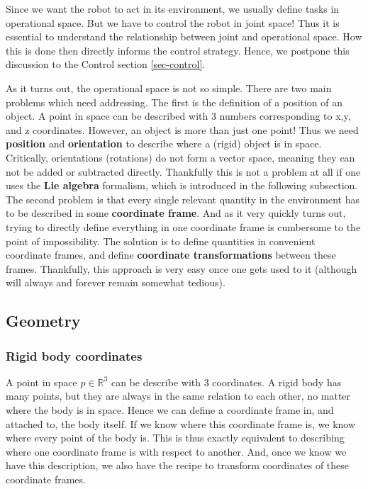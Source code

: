 Since we want the robot to act in its environment,
we usually define tasks in operational space.
But we have to control the robot in joint space!
Thus it is essential to understand the relationship between
joint and operational space. How this is done then
directly informs the control strategy. 
Hence, we postpone this discussion to the Control section
\ref{sec-control}.

As it turns out, the operational space is not so simple.
There are two main problems which need addressing.
The first is the definition of a position of an object.
A point in space can be described with 3 numbers corresponding
to x,y, and z coordinates. However, an object is more than just
one point! Thus we need \textbf{position} and \textbf{orientation}
to describe where a (rigid) object is in space.
Critically, orientations (rotations) do not form a vector space,
meaning they can not be added or subtracted directly.
Thankfully this is not a problem at all if one uses the \textbf{Lie
algebra} formalism, which is introduced in the following subsection.
The second problem is that every single relevant quantity
in the environment has to be described in some \textbf{coordinate frame}.
And as it very quickly turns out, trying to directly
define everything in one coordinate frame is cumbersome
to the point of impossibility.
The solution is to define quantities in convenient coordinate
frames, and define \textbf{coordinate transformations} 
between these frames.
Thankfully, this approach is very easy once one gets used 
to it (although will always and forever remain somewhat tedious).

\subsection{Geometry}
\label{sec-robotics-geometry}
\subsubsection{Rigid body coordinates}
A point in space $ p \in \mathbb{R}^{3}  $ can be describe
with 3 coordinates. A rigid body has many points,
but they are always in the same relation to each other,
no matter where the body is in space.
Hence we can define a coordinate frame in, and attached to,
the body itself. If we know where this coordinate frame
is, we know where every point of the body is.
This is thus exactly equivalent to describing
where one coordinate frame is with respect to another.
And, once we know we have this description,
we also have the recipe to transform coordinates of 
these coordinate frames.

